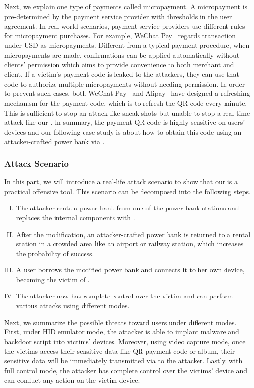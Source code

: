 Next, we explain one type of payments called micropayment. A micropayment is pre-determined by the payment
service provider with thresholds in the user agreement. In real-world scenarios, payment service providers use different rules
for micropayment purchases. For example, WeChat
Pay~\cite{Wechat-pay} regards transaction under USD  as
micropayments.  Different from a typical payment procedure, when micropayments
are made, confirmations can be applied automatically without clients'
permission which aims to provide convenience to both merchant and client.  If a
victim's payment code is leaked to the attackers, they can use that code to
authorize multiple micropayments without needing permission.  In order to prevent such
cases, both WeChat Pay~\cite{Wechat-pay} and Alipay~\cite{AliPay} have designed a refreshing mechanism for the
payment code, which is to refresh the QR code every minute. This is sufficient
to stop an attack like sneak shots but unable to stop a real-time attack like our
\tool.  In summary, the payment QR code is highly sensitive on users' devices
and our following case study is about how to obtain this code using an
attacker-crafted power bank via \tool.

\subsubsection{Attack Scenario}

In this part, we will introduce a real-life attack scenario to show that our
\tool is a practical offensive tool.  This scenario can be decomposed into the
following steps.

\begin{enumerate}[I. ]
	\item The attacker rents a power bank from one of the power bank stations and replaces the internal components with \tool.
	\item After the modification, an attacker-crafted power bank is returned to a rental station in a crowded area like an airport or railway station, which increases the probability of success.
	\item A user borrows the modified power bank and connects it to her own device, becoming the victim of \tool.
	\item The attacker now has complete control over the victim and can perform various attacks using different modes.
\end{enumerate}

Next, we summarize the possible threats toward users under different modes.
First, under \ac{HID} emulator mode, the attacker is able to implant malware and backdoor script into victims' devices. Moreover, using video capture mode, once the victims access their sensitive data like QR payment  code or album, their sensitive data will be immediately transmitted via \tool to the attacker. Lastly, with full control mode, the attacker has complete control over the victims' device and can conduct any action on the victim device.

